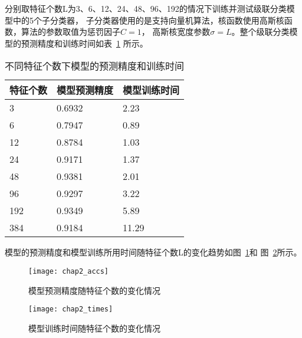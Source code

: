 分别取特征个数L为3、6、12、24、48、96、192的情况下训练并测试级联分类模型中的5个子分类器，
子分类器使用的是支持向量机算法，核函数使用高斯核函数，算法的参数取值为惩罚因子$C=1$，
高斯核宽度参数$\sigma=L$。整个级联分类模型的预测精度和训练时间如表~\ref{tab:chap2_acc_time}
所示。
\begin{table}[htb]
  \centering
  \begin{minipage}[t]{0.8\linewidth} %
  \caption{不同特征个数下模型的预测精度和训练时间}
  \label{tab:chap2_acc_time}
    \begin{tabularx}{\linewidth}{lXX}
      \toprule[1.5pt]
      特征个数 & 模型预测精度 & 模型训练时间 \\\midrule[1pt]
      3   &  0.6932 & 2.23  \\
      6   &  0.7947 & 0.89  \\
      12  &  0.8784 & 1.03  \\
      24  &  0.9171 & 1.37  \\
      48  &  0.9381 & 2.01  \\
      96  &  0.9297 & 3.22  \\
      192 &  0.9349 & 5.89  \\
      384 &  0.9184 & 11.29 \\
      \bottomrule[1.5pt]
    \end{tabularx}
  \end{minipage}
\end{table}

模型的预测精度和模型训练所用时间随特征个数L的变化趋势如图~\ref{fig:chap2_accs}和
图~\ref{fig:chap2_times}所示。
\begin{figure}[ht] %
  \centering
  \texttt{[image: chap2\_accs]}
  \caption{模型预测精度随特征个数的变化情况}
  \label{fig:chap2_accs}
\end{figure}

\begin{figure}[ht] %
  \centering
  \texttt{[image: chap2\_times]}
  \caption{模型训练时间随特征个数的变化情况}
  \label{fig:chap2_times}
\end{figure}

